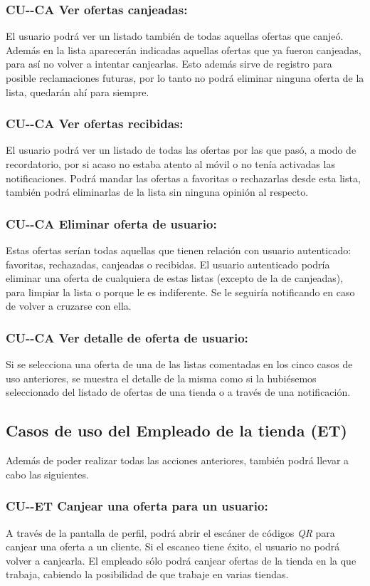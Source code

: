 \subsubsection*{CU-\theUseCase-CA Ver ofertas canjeadas:} El usuario podrá ver un listado también de todas aquellas ofertas que canjeó. Además en la lista aparecerán indicadas aquellas ofertas que ya fueron canjeadas, para así no volver a intentar canjearlas. Esto además sirve de registro para posible reclamaciones futuras, por lo tanto no podrá eliminar ninguna oferta de la lista, quedarán ahí para siempre.
\subsubsection*{CU-\theUseCase-CA Ver ofertas recibidas:} El usuario podrá ver un listado de todas las ofertas por las que pasó, a modo de recordatorio, por si acaso no estaba atento al móvil o no tenía activadas las notificaciones. Podrá mandar las ofertas a favoritas o rechazarlas desde esta lista, también podrá eliminarlas de la lista sin ninguna opinión al respecto.
\subsubsection*{CU-\theUseCase-CA Eliminar oferta de usuario:} Estas ofertas serían todas aquellas que tienen relación con usuario autenticado: favoritas, rechazadas, canjeadas o recibidas. El usuario autenticado podría eliminar una oferta de cualquiera de estas listas (excepto de la de canjeadas), para limpiar la lista o porque le es indiferente. Se le seguiría notificando en caso de volver a cruzarse con ella.
\subsubsection*{CU-\theUseCase-CA Ver detalle de oferta de usuario:} Si se selecciona una oferta de una de las listas comentadas en los cinco casos de uso anteriores, se muestra el detalle de la misma como si la hubiésemos seleccionado del listado de ofertas de una tienda o a través de una notificación.
\subsection*{Casos de uso del  Empleado de la tienda (ET)}
Además de poder realizar todas las acciones anteriores, también podrá llevar a cabo las siguientes.
\subsubsection*{CU-\theUseCase-ET Canjear una oferta para un usuario:} A través de la pantalla de perfil, podrá abrir el escáner de códigos \textit{QR} para canjear una oferta a un cliente. Si el escaneo tiene éxito, el usuario no podrá volver a canjearla. El empleado sólo podrá canjear ofertas de la tienda en la que trabaja, cabiendo la posibilidad de que trabaje en varias tiendas.
